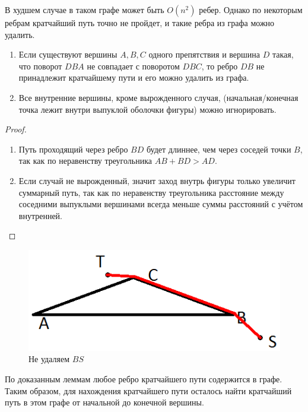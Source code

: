 В худшем случае в таком графе может быть $O(n^2)$ ребер.
Однако по некоторым ребрам кратчайший путь точно не пройдет, и такие ребра из графа можно удалить. 

\begin{lemma}
    \begin{enumerate}
        \item Если существуют вершины $A,B,C$ одного препятствия и вершина $D$ такая, что поворот $DBA$ не совпадает с поворотом $DBC$, то ребро $DB$ не принадлежит кратчайшему пути и его можно удалить из графа.
        \item Все внутренние вершины, кроме вырожденного случая, (начальная/конечная точка лежит внутри выпуклой оболочки фигуры) можно игнорировать.
    \end{enumerate}
\end{lemma}
\begin{proof}
    \begin{enumerate}
        \item Путь проходящий через ребро $BD$ будет длиннее, чем через соседей точки $B$, так как по неравенству треугольника $AB+BD>AD$.
        \item Если случай не вырожденный, значит заход внутрь фигуры только увеличит суммарный путь, так как по неравенству треугольника расстояние между соседними выпуклыми вершинами всегда меньше суммы расстояний с учётом внутренней.
    \end{enumerate}
\end{proof}


\begin{figure}
    \centering
    \includegraphics[width=0.5\linewidth]{img/15_3.png}
    \caption{Не удаляем $BS$}
\end{figure}

По доказанным леммам любое ребро кратчайшего пути содержится в графе.
Таким образом, для нахождения кратчайшего пути осталось найти кратчайший путь в этом графе от начальной до конечной вершины. 

